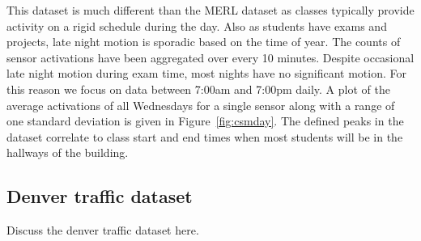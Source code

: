 


This dataset is much different than the MERL dataset as classes typically provide activity on a rigid schedule during the day.  Also as students have exams and projects, late night motion is sporadic based on the time of year.  The counts of sensor activations have been aggregated over every 10 minutes.  Despite occasional late night motion during exam time, most nights have no significant motion.  For this reason we focus on data between 7:00am and 7:00pm daily.  A plot of the average activations of all Wednesdays for a single sensor along with a range of one standard deviation is given in Figure~\ref{fig:csmday}.  The defined peaks in the dataset correlate to class start and end times when most students will be in the hallways of the building.

\subsection{Denver traffic dataset}
Discuss the denver traffic dataset here.